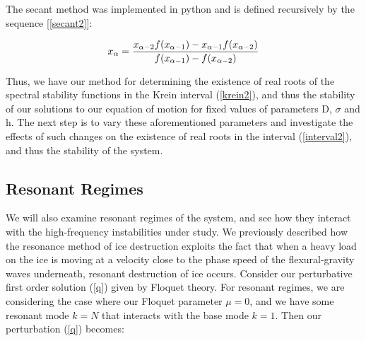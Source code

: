\documentclass{article}
\begin{document}
The secant method was implemented in python and is defined recursively by the sequence [\ref{secant2}]: 

 \begin{equation} \label{secant}
  x_{\alpha} = \frac{ x_{\alpha-2}f(x_{\alpha-1}) - x_{\alpha-1}f(x_{\alpha-2}) }{f(x_{\alpha-1}) - f(x_{\alpha-2})}
\\
\end{equation}

\vspace{10}
Thus, we have our method for determining the existence of real roots of the spectral stability functions in the Krein interval (\ref{krein2}), and thus the stability of our solutions to our equation of motion for fixed values of parameters D, \(\sigma\) and h. The next step is to vary these aforementioned parameters and investigate the effects of such changes on the existence of real roots in the interval (\ref{interval2}), and thus the stability of the system. \\

\subsection{Resonant Regimes}

We will also examine resonant regimes of the system, and see how they interact with the high-frequency instabilities under study. We previously described how the resonance method of ice destruction exploits the fact that when a heavy load on the ice is moving at a velocity close to the phase speed of the flexural-gravity waves underneath, resonant destruction of ice occurs. Consider our perturbative first order solution (\ref{q}) given by Floquet theory. For resonant regimes, we are considering the case where our Floquet parameter \(\mu = 0\), and we have some resonant mode \(k = N\) that interacts with the base mode \(k = 1\). Then our perturbation (\ref{q}) becomes:
\end{document}
